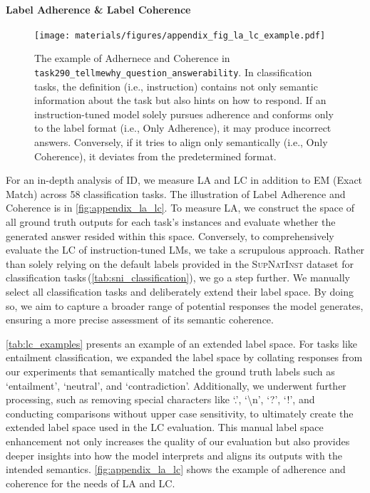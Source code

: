 \paragraph{Label Adherence \& Label Coherence}

\begin{figure}
\centering
\vspace{-10pt}
\texttt{[image: materials/figures/appendix\_fig\_la\_lc\_example.pdf]}
\vspace{-10pt}
\caption{The example of Adhernece and Coherence in \texttt{task290\_tellmewhy\_question\_answerability}. In classification tasks, the definition (i.e., instruction) contains not only semantic information about the task but also hints on how to respond. If an instruction-tuned model solely pursues adherence and conforms only to the label format (i.e., Only Adherence), it may produce incorrect answers. Conversely, if it tries to align only semantically (i.e., Only Coherence), it deviates from the predetermined format.}
\vspace{-12pt}
\label{fig:appendix_la_lc}
\end{figure}
For an in-depth analysis of ID, we measure LA and LC in addition to EM (Exact Match) across 58 classification tasks. The illustration of Label Adherence and Coherence is in \autoref{fig:appendix_la_lc}. To measure LA, we construct the space of all ground truth outputs for each task's instances and evaluate whether the generated answer resided within this space. Conversely, to comprehensively evaluate the LC of instruction-tuned LMs, we take a scrupulous approach. Rather than solely relying on the default labels provided in the \textsc{SupNatInst} dataset for classification tasks\,(\autoref{tab:sni_classification}), we go a step further. We manually select all classification tasks and deliberately extend their label space. By doing so, we aim to capture a broader range of potential responses the model generates, ensuring a more precise assessment of its semantic coherence.

\autoref{tab:lc_examples} presents an example of an extended label space. For tasks like entailment classification, we expanded the label space by collating responses from our experiments that semantically matched the ground truth labels such as `entailment', `neutral', and `contradiction'. Additionally, we underwent further processing, such as removing special characters like `.', `\textbackslash n', `?', `!', and conducting comparisons without upper case sensitivity, to ultimately create the extended label space used in the LC evaluation. This manual label space enhancement not only increases the quality of our evaluation but also provides deeper insights into how the model interprets and aligns its outputs with the intended semantics. \autoref{fig:appendix_la_lc} shows the example of adherence and coherence for the needs of LA and LC.


